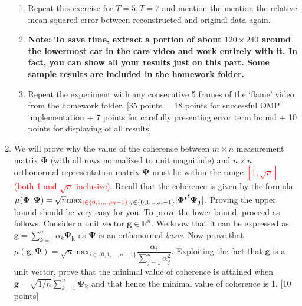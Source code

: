 \documentclass[11pt]{article}
\begin{document}
\begin{enumerate}
\begin{enumerate}
\item Repeat this exercise for $T = 5, T = 7$ and mention the mention the relative mean squared error between reconstructed and original data again.
\item \textbf{Note: To save time, extract a portion of about $120 \times 240$ around the lowermost car in the cars video and work entirely with it. In fact, you can show all your results just on this part. Some sample results are included in the homework folder.}
\item Repeat the experiment with any consecutive 5 frames of the `flame' video from the homework folder. 
\textsf{[35 points = 18 points for successful OMP implementation + 7 points for carefully presenting error term bound + 10 points for displaying of all results]}
\end{enumerate}

\item We will prove why the value of the coherence between $m \times n$ measurement matrix $\boldsymbol{\Phi}$ (with all rows normalized to unit magnitude) and $n \times n$ orthonormal representation matrix $\boldsymbol{\Psi}$ must lie within the range \textcolor{red}{$[1,\sqrt{n}]$ (both 1 and $\sqrt{n}$ inclusive).} 
Recall that the coherence is given by the formula \\
$\mu(\boldsymbol{\Phi},\boldsymbol{\Psi}) = \sqrt{n} \textrm{max}_{\textcolor{red}{i \in \{0,1,...,m-1\}}, j \in \{0,1,...,n-1\}} |\boldsymbol{\Phi^i}^t \boldsymbol{\Psi_j}|$. 
Proving the upper bound should be very easy for you. To prove the lower bound, proceed as follows. Consider a unit vector $\boldsymbol{g} \in \mathbb{R}^n$. We know that it can be expressed as $\boldsymbol{g} = \sum_{k=1}^n \alpha_k \boldsymbol{\Psi_k}$ as $\boldsymbol{\Psi}$ is an orthonormal \emph{basis}. Now prove that $\mu(\boldsymbol{g},\boldsymbol{\Psi}) = \sqrt{n} \textrm{max}_{i \in \{0,1,...,n-1\}} \dfrac{|\alpha_i|}{\sum_{j=1}^n \alpha^2_j}$. Exploiting the fact that $\boldsymbol{g}$ is a unit vector, prove that the minimal value of coherence is attained when $\boldsymbol{g} = \sqrt{1/n} \sum_{k=1}^n \boldsymbol{\Psi_k}$ and that hence the minimal value of coherence is 1. \textsf{[10 points]}


\end{enumerate}
\end{document}
